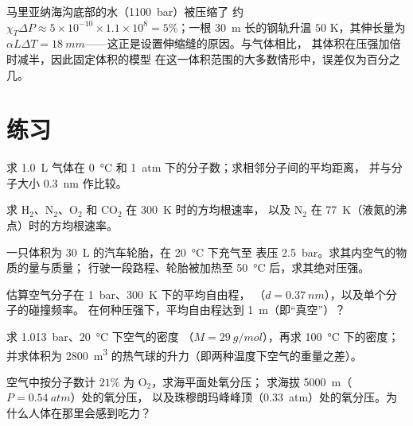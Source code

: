 \begin{example}[水有多难压缩]\label{ex:b1:kinetic-theory:water}
马里亚纳海沟底部的水（\qty{1100}{bar}）被压缩了
约 $\chi_T\Delta P \approx 5\times10^{-10} \times 1.1\times10^8 = 5\%$；一根
\qty{30}{m} 长的钢轨升温 $50$ K，其伸长量为 $\alpha L\Delta T =
\qty{18}{mm}$——这正是设置伸缩缝的原因。与气体相比，
其体积在压强加倍时减半，因此固定体积的模型
在这一体积范围的大多数情形中，误差仅为百分之几。
\end{example}

\section{练习}

\begin{exercise}[$\star$]\label{exo:b1:kinetic-theory:1}
求 \qty{1.0}{L} 气体在 \qty{0}{\degreeCelsius} 和
\qty{1}{atm} 下的分子数；求相邻分子间的平均距离，
并与分子大小 \qty{0.3}{nm} 作比较。
\end{exercise}

\begin{exercise}[$\star$]\label{exo:b1:kinetic-theory:2}
求 H$_2$、N$_2$、O$_2$ 和 CO$_2$ 在 \qty{300}{K} 时的方均根速率，
以及 N$_2$ 在 \qty{77}{K}（液氮的沸点）时的方均根速率。
\end{exercise}

\begin{exercise}[$\star$]\label{exo:b1:kinetic-theory:3}
一只体积为 \qty{30}{L} 的汽车轮胎，在 \qty{20}{\degreeCelsius} 下充气至
表压 \qty{2.5}{bar}。求其内空气的物质的量与质量；
行驶一段路程、轮胎被加热至 \qty{50}{\degreeCelsius} 后，求其绝对压强。
\end{exercise}

\begin{exercise}[$\star$]\label{exo:b1:kinetic-theory:4}
估算空气分子在 \qty{1}{bar}、\qty{300}{K} 下的平均自由程，
（$d = \qty{0.37}{nm}$），以及单个分子的碰撞频率。
在何种压强下，平均自由程达到 \qty{1}{m}（即“真空”）？
\end{exercise}

\begin{exercise}[$\star\star$]\label{exo:b1:kinetic-theory:5}
求 \qty{1.013}{bar}、\qty{20}{\degreeCelsius} 下空气的密度
（$M = \qty{29}{g/mol}$），再求 \qty{100}{\degreeCelsius} 下的密度；
并求体积为 \qty{2800}{m^3} 的热气球的升力（即两种温度下空气的重量之差）。
\end{exercise}

\begin{exercise}[$\star\star$]\label{exo:b1:kinetic-theory:6}
空气中按分子数计 $21\%$ 为 O$_2$，求海平面处氧分压；
求海拔 \qty{5000}{m}（$P = \qty{0.54}{atm}$）处的氧分压，
以及珠穆朗玛峰峰顶（\qty{0.33}{atm}）处的氧分压。为什么人体在那里会感到吃力？
\end{exercise}

